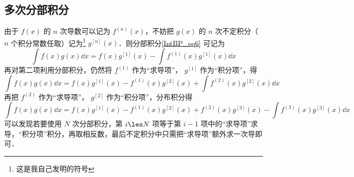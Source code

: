 \subsection{多次分部积分}
由于 $f(x)$ 的 $n$ 次导数可以记为 $f^{(n)}(x)$，不妨把 $g(x)$ 的 $n$ 次不定积分（ $n$ 个积分常数任取）记为\footnote{这是我自己发明的符号} $g^{[n]}(x)$．则分部积分\autoref{IntBP_eq6} 可记为
\begin{equation}
\int f(x)g(x) \dd{x}  = f(x) g^{[1]}(x) - \int f^{(1)}(x) g^{[1]}(x) \dd{x}
\end{equation}
再对第二项利用分部积分，仍然将 $f^{(1)}$ 作为“求导项”， $g^{[1]}$ 作为“积分项”，得
\begin{equation}
\int f(x)g(x) \dd{x}  = f(x) g^{[1]}(x) - f^{(1)}(x) g^{[2]}(x) + \int f^{(2)}(x) g^{[2]}(x) \dd{x}
\end{equation}
再把 $f^{(2)}$ 作为“求导项”， $g^{[2]}$ 作为“积分项”，分布积分得
\begin{equation}
\int f(x)g(x) \dd{x} = f(x) g^{[1]}(x) - f^{(1)}(x) g^{[2]}(x) + f^{(2)}(x)g^{[3]}(x) - \int f^{(3)}(x) g^{[3]}(x) \dd{x}
\end{equation}
可以发现若要使用 $N$ 次分部积分，第 $i \les N$ 项等于第 $i-1$ 项中的“求导项”求导，“积分项”积分，再取相反数，最后不定积分中只需把“求导项”额外求一次导即可． 

